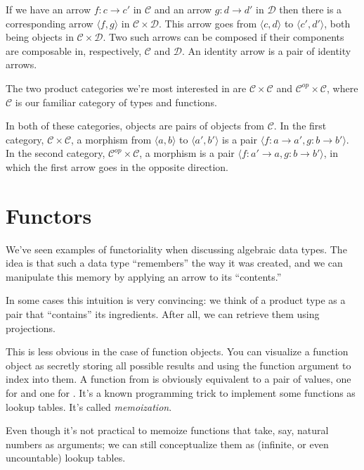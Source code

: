 \documentclass[DaoFP]{subfiles}
\begin{document}
If we have an arrow $f \colon c \to c'$ in $\mathcal{C}$ and an arrow $g \colon d \to d'$ in $\mathcal{D}$ then there is a corresponding arrow $\langle f, g \rangle$ in $\mathcal{C} \times \mathcal{D}$.  This arrow goes from $\langle c, d \rangle $ to $\langle c', d' \rangle $, both being objects in $\mathcal{C} \times \mathcal{D}$. Two such arrows can be composed if their components are composable in, respectively, $\mathcal{C}$ and $\mathcal{D}$. An identity arrow is a pair of identity arrows.

The two product categories we're most interested in are $\mathcal{C} \times \mathcal{C}$ and $\mathcal{C}^{op} \times \mathcal{C}$, where $\mathcal{C}$ is our familiar category of types and functions.

In both of these categories, objects are pairs of objects from $\mathcal{C}$. In the first category, $\mathcal{C} \times \mathcal{C}$, a morphism from $\langle a, b \rangle $ to $\langle a', b' \rangle $ is a pair $\langle f \colon a \to a', g \colon b \to b' \rangle $. In the second category, $\mathcal{C}^{op} \times \mathcal{C}$, a morphism is a pair $\langle f \colon a' \to a, g \colon b \to b' \rangle $, in which the first arrow goes in the opposite direction.

\section{Functors}

We've seen examples of functoriality when discussing algebraic data types. The idea is that such a data type ``remembers'' the way it was created, and we can manipulate this memory by applying an arrow to its ``contents.'' 

In some cases this intuition is very convincing: we think of a product type as a pair that ``contains'' its ingredients. After all, we can retrieve them using projections. 

This is less obvious in the case of function objects. You can visualize a function object as secretly storing all possible results and using the function argument to index into them. A function from  is obviously equivalent to a pair of values, one for  and one for . It's a known programming trick to implement some functions as lookup tables. It's called \emph{memoization}. 

Even though it's not practical to memoize functions that take, say, natural numbers as arguments; we can still conceptualize them as (infinite, or even uncountable) lookup tables.
\end{document}
